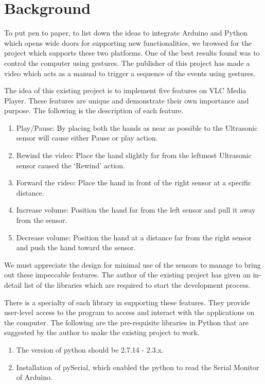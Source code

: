 \documentclass[12pt,journal]{IEEEtran}
\begin{document}


\section{Background}

To put pen to paper, to list down the ideas to integrate Arduino and Python which opens wide doors for supporting new functionalities, we browsed for the project which supports these two platforms. One of the best results found was to control the computer using gestures. The publisher of this project has made a video which acts as a manual to trigger a sequence of the events using gestures.
\par The idea of this existing project is to implement five features on VLC Media Player. These features are unique and demonstrate their own importance and purpose. The following is the description of each feature.
\begin{enumerate}
  \item Play/Pause: By placing both the hands as near as possible to the Ultrasonic sensor will cause either Pause or play action.
  \bigskip
  \item Rewind the video: Place the hand slightly far from the leftmost Ultrasonic sensor caused the ‘Rewind’ action.
  \bigskip
  \item Forward the video: Place the hand in front of the right sensor at a specific distance.
  \bigskip
  \item Increase volume: Position the hand far from the left sensor and pull it away from the sensor.
  \bigskip
  \item Decrease volume: Position the hand at a distance far from the right sensor and push the hand toward the sensor.
\end{enumerate}
\par We must appreciate the design for minimal use of the sensors to manage to bring out these impeccable features.  The author of the existing project has given an in-detail list of the libraries which are required to start the development process. 
\par There is a specialty of each library in supporting these features. They provide user-level access to the program to access and interact with the applications on the computer. The following are the pre-requisite libraries in Python that are suggested by the author to make the existing project to work.
\begin{enumerate}
  \item The version of python should be 2.7.14 - 2.3.x.
  \item Installation of pySerial, which enabled the python to read the Serial Monitor of Arduino.
\end{enumerate}
\end{document}
